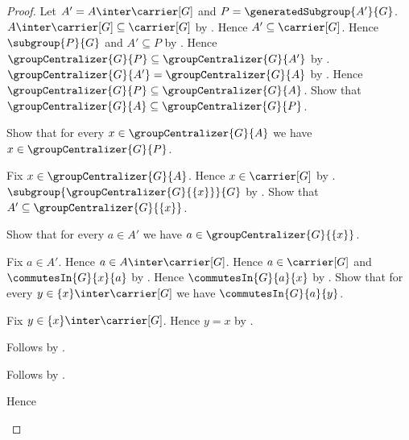 \begin{proof}
    Let $A'=A\inter\carrier[G]$ and
        $P=\generatedSubgroup{A'}{G}$.
    $A\inter\carrier[G]\subseteq\carrier[G]$ by
        .
    Hence $A'\subseteq\carrier[G]$.
    Hence $\subgroup{P}{G}$ and $A'\subseteq P$ by
        .
    Hence $\groupCentralizer{G}{P}\subseteq
        \groupCentralizer{G}{A'}$ by
        .
    $\groupCentralizer{G}{A'}=\groupCentralizer{G}{A}$ by
        .
    Hence $\groupCentralizer{G}{P}\subseteq
        \groupCentralizer{G}{A}$.
    Show that $\groupCentralizer{G}{A}\subseteq
        \groupCentralizer{G}{P}$.
    \begin{subproof}
        Show that for every $x\in\groupCentralizer{G}{A}$ we have
            $x\in\groupCentralizer{G}{P}$.
        \begin{subproof}
            Fix $x\in\groupCentralizer{G}{A}$.
            Hence $x\in\carrier[G]$ by .
            $\subgroup{\groupCentralizer{G}{\{x\}}}{G}$ by
                .
            Show that $A'\subseteq\groupCentralizer{G}{\{x\}}$.
            \begin{subproof}
                Show that for every $a\in A'$ we have
                    $a\in\groupCentralizer{G}{\{x\}}$.
                \begin{subproof}
                    Fix $a\in A'$.
                    Hence $a\in A\inter\carrier[G]$.
                    Hence $a\in\carrier[G]$ and
                        $\commutesIn{G}{x}{a}$ by
                        .
                    Hence $\commutesIn{G}{a}{x}$ by
                        .
                    Show that for every $y\in\{x\}\inter\carrier[G]$
                        we have $\commutesIn{G}{a}{y}$.
                    \begin{subproof}
                        Fix $y\in\{x\}\inter\carrier[G]$.
                        Hence $y=x$ by
                            .
                    \end{subproof}
                    Follows by .
                \end{subproof}
                Follows by .
            \end{subproof}
            Hence

\end{subproof}
\end{subproof}
\end{proof}
